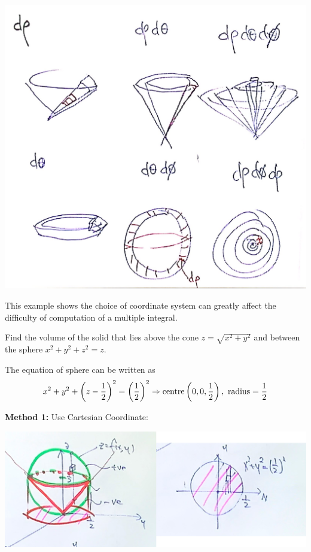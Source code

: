 \begin{spacing}{1.3}
    \begin{center}
        \includegraphics[scale=0.2]{images/Ch14-int-sphere-ways.JPG}
    \end{center}

    \newpage
    {\blue This example shows the choice of coordinate system can greatly affect the difficulty of 
    computation of a multiple integral.}

    \eg Find the volume of the solid that lies above the cone $z=\sqrt{x^2+y^2}$ and between the 
    sphere $x^2+y^2+z^2=z$.

    \sol The equation of sphere can be written as 
    $$x^{2}+y^{2}+\left(z-\frac{1}{2}\right)^{2}=\left(\frac{1}{2}\right)^{2} 
    \Rightarrow {\rm centre} \left(0,0, \frac{1}{2}\right),\ {\rm radius} =\frac{1}{2}$$

    {\bf Method 1:} Use Cartesian Coordinate: 
    \begin{center}
        \includegraphics[scale=0.25]{images/Ch14-ex6.10-xy.jpg}
    \end{center}
    

\end{spacing}

